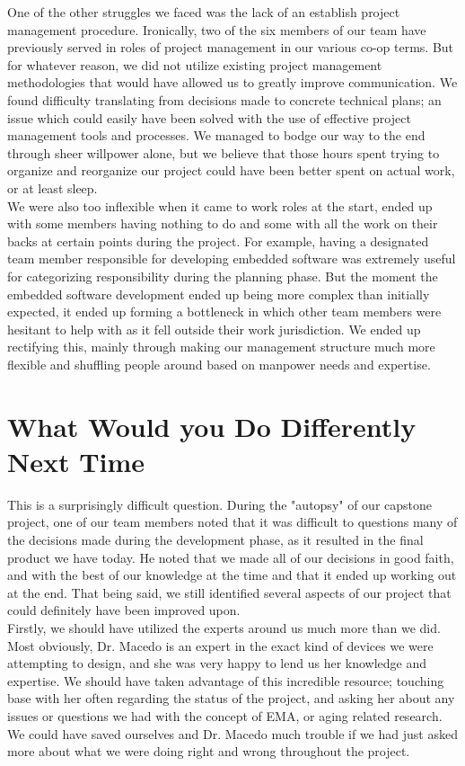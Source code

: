 \documentclass{article}
\begin{document}
One of the other struggles we faced was the lack of an establish project management procedure. Ironically, two of the six members of our team have previously served in roles of project management in our various co-op terms. But for whatever reason, we did not utilize existing project management methodologies that would have allowed us to greatly improve communication. We found difficulty translating from decisions made to concrete technical plans; an issue which could easily have been solved with the use of effective project management tools and processes. We managed to bodge our way to the end through sheer willpower alone, but we believe that those hours spent trying to organize and reorganize our project could have been better spent on actual work, or at least sleep.\\

We were also too inflexible when it came to work roles at the start, ended up with some members having nothing to do and some with all the work on their backs at certain points during the project. For example, having a designated team member responsible for developing embedded software was extremely useful for categorizing responsibility during the planning phase. But the moment the embedded software development ended up being more complex than initially expected, it ended up forming a bottleneck in which other team members were hesitant to help with as it fell outside their work jurisdiction. We ended up rectifying this, mainly through making our management structure much more flexible and shuffling people around based on manpower needs and expertise.\\

\section{What Would you Do Differently Next Time}

This is a surprisingly difficult question. During the "autopsy" of our capstone project, one of our team members noted that it was difficult to questions many of the decisions made during the development phase, as it resulted in the final product we have today. He noted that we made all of our decisions in good faith, and with the best of our knowledge at the time and that it ended up working out at the end. That being said, we still identified several aspects of our project that could definitely have been improved upon.\\

Firstly, we should have utilized the experts around us much more than we did. Most obviously, Dr. Macedo is an expert in the exact kind of devices we were attempting to design, and she was very happy to lend us her knowledge and expertise. We should have taken advantage of this incredible resource; touching base with her often regarding the status of the project, and asking her about any issues or questions we had with the concept of EMA, or aging related research. We could have saved ourselves and Dr. Macedo much trouble if we had just asked more about what we were doing right and wrong throughout the project. \\
\end{document}
